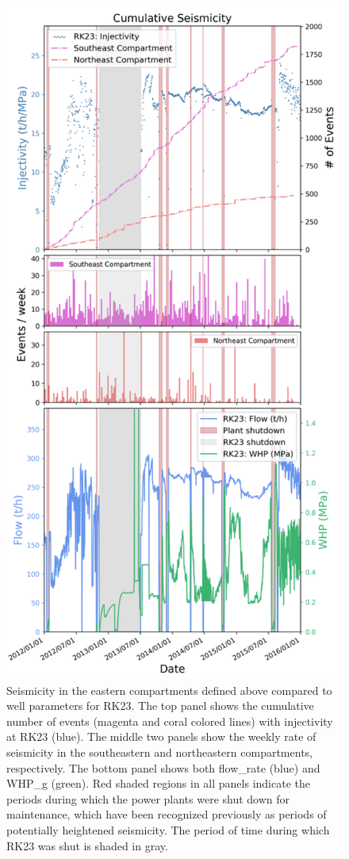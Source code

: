 \begin{figure}[p]
\begin{center}
\includegraphics[width=0.63\columnwidth]{Chapter_4_Rot/figures/Rot_dets_GC_normalized_east_compartment_RK23_flow/Rot_dets_GC_four_panel_II-rate-WHP_east_compartment_RK23}
\caption[Eastern compartments' seismicity and RK23 injection parameters]{{
Seismicity in the eastern compartments defined above compared to well
parameters for RK23. The top panel shows the cumulative number of
events (magenta and coral colored lines) with \gls{injectivity} at RK23
(blue). The middle two panels show the weekly rate of seismicity in the
southeastern and northeastern compartments, respectively. The bottom
panel shows both \gls{flow_rate} (blue) and \gls{WHP_g} (green). Red
shaded regions in all panels indicate the periods during which the power
plants were shut down for maintenance, which have been recognized
previously as periods of potentially heightened seismicity. The period
of time during which RK23 was shut is shaded in gray.
{\label{102850}}%
}}
\end{center}
\end{figure}

